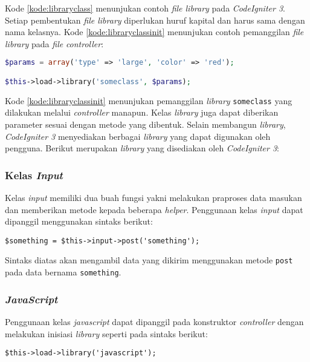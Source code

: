Kode \ref{kode:libraryclass} menunjukan contoh \textit{file library} pada \textit{CodeIgniter 3}. Setiap pembentukan \textit{file library} diperlukan huruf kapital dan harus sama dengan nama kelasnya. Kode \ref{kode:libraryclassinit} menunjukan contoh pemanggilan \textit{file} \textit{library} pada \textit{file} \textit{controller}:

\begin{lstlisting}[language=PHP, caption=Contoh pemanggilan \textit{library} pada \textit{file} \textit{controller}, label=kode:libraryclassinit]
$params = array('type' => 'large', 'color' => 'red');

$this->load->library('someclass', $params);
\end{lstlisting}

Kode \ref{kode:libraryclassinit} menunjukan pemanggilan \textit{library} \texttt{someclass} yang dilakukan melalui \textit{controller} manapun. Kelas \textit{library} juga dapat diberikan parameter sesuai dengan metode yang dibentuk. Selain membangun \textit{library}, \textit{CodeIgniter 3} menyediakan berbagai \textit{library} yang dapat digunakan oleh pengguna. Berikut merupakan \textit{library} yang disediakan oleh \textit{CodeIgniter 3}:

\subsubsection{Kelas \textit{Input}}
Kelas \textit{input} memiliki dua buah fungsi yakni melakukan praproses data masukan dan memberikan metode kepada beberapa \textit{helper}. Penggunaan kelas \textit{input} dapat dipanggil menggunakan sintaks berikut:
\begin{center}
	\verb|$something = $this->input->post('something');|
\end{center}
Sintaks diatas akan mengambil data yang dikirim menggunakan metode \texttt{post} pada data bernama \texttt{something}.

\subsubsection{\textit{JavaScript}}
Penggunaan kelas \textit{javascript} dapat dipanggil pada konstruktor \textit{controller} dengan melakukan inisiasi \textit{library} seperti pada sintaks berikut:

\begin{center}
\verb|$this->load->library('javascript');|
\end{center}

